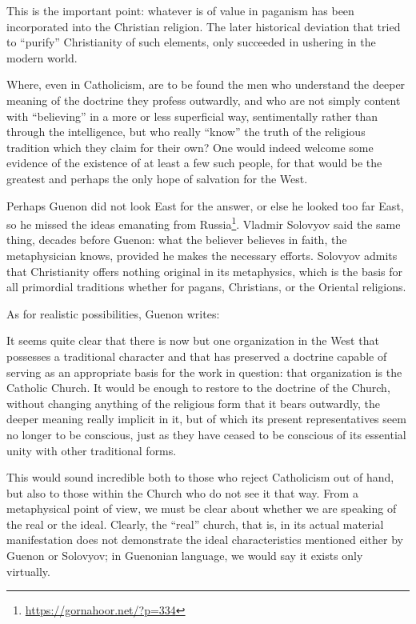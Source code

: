 This is the important point: whatever is of value in paganism has been incorporated into the Christian religion. The later historical deviation that tried to ``purify'' Christianity of such elements, only succeeded in ushering in the modern world.

\begin{quotex}
Where, even in Catholicism, are to be found the men who understand the deeper meaning of the doctrine they profess outwardly, and who are not simply content with ``believing'' in a more or less superficial way, sentimentally rather than through the intelligence, but who really ``know'' the truth of the religious tradition which they claim for their own? One would indeed welcome some evidence of the existence of at least a few such people, for that would be the greatest and perhaps the only hope of salvation for the West.
\end{quotex}


Perhaps Guenon did not look East for the answer, or else he looked too far East, so he missed the ideas emanating from Russia\footnote{\url{https://gornahoor.net/?p=334}}. Vladmir Solovyov said the same thing, decades before Guenon: what the believer believes in faith, the metaphysician knows, provided he makes the necessary efforts. Solovyov admits that Christianity offers nothing original in its metaphysics, which is the basis for all primordial traditions whether for pagans, Christians, or the Oriental religions.

As for realistic possibilities, Guenon writes:

\begin{quotex}
It seems quite clear that there is now but one organization in the West that possesses a traditional character and that has preserved a doctrine capable of serving as an appropriate basis for the work in question: that organization is the Catholic Church. It would be enough to restore to the doctrine of the Church, without changing anything of the religious form that it bears outwardly, the deeper meaning really implicit in it, but of which its present representatives seem no longer to be conscious, just as they have ceased to be conscious of its essential unity with other traditional forms.
\end{quotex}


This would sound incredible both to those who reject Catholicism out of hand, but also to those within the Church who do not see it that way. From a metaphysical point of view, we must be clear about whether we are speaking of the real or the ideal. Clearly, the ``real'' church, that is, in its actual material manifestation does not demonstrate the ideal characteristics mentioned either by Guenon or Solovyov; in Guenonian language, we would say it exists only virtually.

